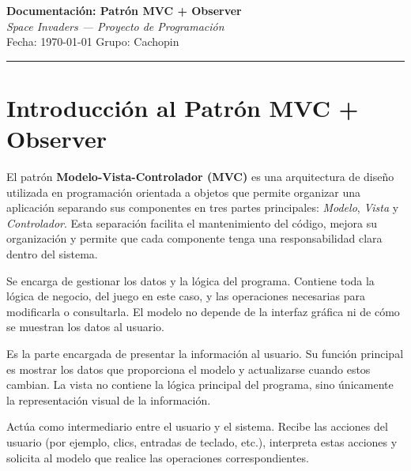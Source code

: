 \documentclass[12pt, a4paper]{article}
\begin{document}
\begin{center}
    {\LARGE \textbf{Documentación: Patrón MVC + Observer}}\\[0.4em]
    {\large \textit{Space Invaders — Proyecto de Programación}}\\[0.3em]
    {\small Fecha: \today}
    {\small Grupo: Cachopin}
\end{center}

\vspace{0.5em}
\hrule
\vspace{1.5em}

\tableofcontents
\newpage

\section{Introducción al Patrón MVC + Observer}

El patrón \textbf{Modelo-Vista-Controlador (MVC)} es una arquitectura de diseño utilizada en programación orientada a objetos que permite organizar una aplicación separando sus componentes en tres partes principales: \textit{Modelo}, \textit{Vista} y \textit{Controlador}. Esta separación facilita el mantenimiento del código, mejora su organización y permite que cada componente tenga una responsabilidad clara dentro del sistema.

\begin{description}[leftmargin=2em, style=nextline]
    \item[\textbf{Modelo}]
        Se encarga de gestionar los datos y la lógica del programa. Contiene toda la lógica de negocio, del juego en este caso, y las operaciones necesarias para modificarla o consultarla. El modelo no depende de la interfaz gráfica ni de cómo se muestran los datos al usuario.

    \item[\textbf{Vista}]
        Es la parte encargada de presentar la información al usuario. Su función principal es mostrar los datos que proporciona el modelo y actualizarse cuando estos cambian. La vista no contiene la lógica principal del programa, sino únicamente la representación visual de la información.

    \item[\textbf{Controlador}]
        Actúa como intermediario entre el usuario y el sistema. Recibe las acciones del usuario (por ejemplo, clics, entradas de teclado, etc.), interpreta estas acciones y solicita al modelo que realice las operaciones correspondientes.
\end{description}
\end{document}

